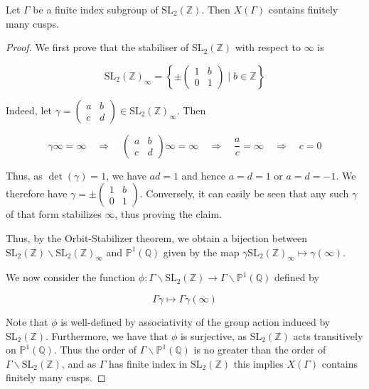 \begin{proposition}\label{2.7.5}
    Let $\Gamma$ be a finite index subgroup of $\mathrm{SL}_{2}(\mathbb{Z})$. Then $X(\Gamma)$ contains finitely many cusps.
\begin{proof}
    We first prove that the stabiliser of $\mathrm{SL}_{2}(\mathbb{Z})$ with respect to $\infty$ is

$$
\mathrm{SL}_{2}(\mathbb{Z})_{\infty}=\left\{ \pm\left(\begin{array}{ll}
1 & b \\
0 & 1
\end{array}\right) \mid b \in \mathbb{Z}\right\}
$$

Indeed, let $\gamma=\left(\begin{array}{ll}a & b \\ c & d\end{array}\right) \in \mathrm{SL}_{2}(\mathbb{Z})_{\infty}$. Then

$$
\gamma \infty=\infty \quad \Longrightarrow \quad\left(\begin{array}{ll}
a & b \\
c & d
\end{array}\right) \infty=\infty \quad \Longrightarrow \quad \frac{a}{c}=\infty \quad \Longrightarrow \quad c=0
$$

Thus, as $\operatorname{det}(\gamma)=1$, we have $a d=1$ and hence $a=d=1$ or $a=d=-1$. We therefore have $\gamma= \pm\left(\begin{array}{ll}1 & b \\ 0 & 1\end{array}\right)$. Conversely, it can easily be seen that any such $\gamma$ of that form stabilizes $\infty$, thus proving the claim. 

Thus, by the Orbit-Stabilizer theorem, we obtain a bijection between $\mathrm{SL}_{2}(\mathbb{Z}) \backslash \mathrm{SL}_{2}(\mathbb{Z})_{\infty}$ and $\mathbb{P}^{1}(\mathbb{Q})$ given by the map $\gamma \mathrm{SL}_{2}(\mathbb{Z})_{\infty} \mapsto \gamma(\infty)$.

We now consider the function $\phi: \Gamma \backslash \mathrm{SL}_{2}(\mathbb{Z}) \rightarrow \Gamma \backslash \mathbb{P}^{1}(\mathbb{Q})$ defined by

$$
\Gamma \gamma \mapsto \Gamma \gamma(\infty)
$$

Note that $\phi$ is well-defined by associativity of the group action induced by $\mathrm{SL}_{2}(\mathbb{Z})$. Furthermore, we have that $\phi$ is surjective, as $\mathrm{SL}_{2}(\mathbb{Z})$ acts transitively on $\mathbb{P}^{1}(\mathbb{Q})$. Thus the order of $\Gamma \backslash \mathbb{P}^{1}(\mathbb{Q})$ is no greater than the order of $\Gamma \backslash \mathrm{SL}_{2}(\mathbb{Z})$, and as $\Gamma$ has finite index in $\mathrm{SL}_{2}(\mathbb{Z})$ this implies $X(\Gamma)$ contains finitely many cusps.

\end{proof}
\end{proposition}

